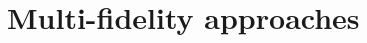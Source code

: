\renewcommand{\lecturetitle}{Multi-fidelity approaches}
\renewcommand{\lecturetime}{Week 9, Video 5}
\section{\lecturetitle}

